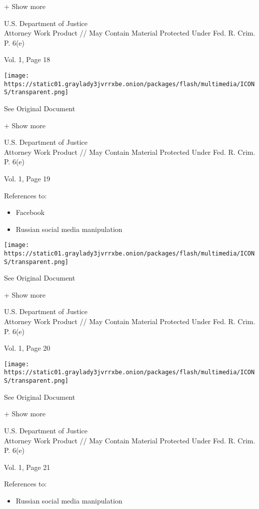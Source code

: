 + Show more

U.S. Department of Justice\\
Attorney Work Product // May Contain Material Protected Under Fed. R.
Crim. P. 6(e)

Vol. 1, Page 18

\protect\hyperlink{}{}

\texttt{[image: https://static01.graylady3jvrrxbe.onion/packages/flash/multimedia/ICONS/transparent.png]}

See Original Document

+ Show more

U.S. Department of Justice\\
Attorney Work Product // May Contain Material Protected Under Fed. R.
Crim. P. 6(e)

Vol. 1, Page 19

References to:

\begin{itemize}
\tightlist
\item
  Facebook
\item
  Russian social media manipulation
\end{itemize}

\protect\hyperlink{}{}

\texttt{[image: https://static01.graylady3jvrrxbe.onion/packages/flash/multimedia/ICONS/transparent.png]}

See Original Document

+ Show more

U.S. Department of Justice\\
Attorney Work Product // May Contain Material Protected Under Fed. R.
Crim. P. 6(e)

Vol. 1, Page 20

\protect\hyperlink{}{}

\texttt{[image: https://static01.graylady3jvrrxbe.onion/packages/flash/multimedia/ICONS/transparent.png]}

See Original Document

+ Show more

U.S. Department of Justice\\
Attorney Work Product // May Contain Material Protected Under Fed. R.
Crim. P. 6(e)

Vol. 1, Page 21

References to:

\begin{itemize}
\tightlist
\item
  Russian social media manipulation
\end{itemize}

